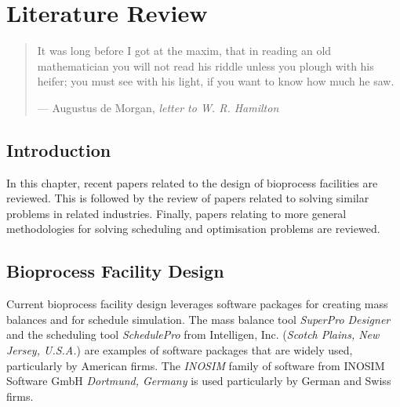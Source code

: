 %
%
%
%

\chapter{Literature Review}\label{C.litreview}

\begin{quote}
It was long before I got at the maxim, that in reading an old mathematician you
will not read his riddle unless you plough with his heifer; you must see with
his light, if you want to know how much he saw.

\hspace{2cm}--- Augustus de Morgan, \emph{letter to W. R. Hamilton}
\end{quote}

\section{Introduction}\label{S.intro2}

In this chapter, recent papers related to the design of bioprocess facilities
are reviewed.  This is followed by the review of papers related to solving
similar problems in related industries.  Finally, papers relating to more
general methodologies for solving scheduling and optimisation problems are
reviewed.

\section{Bioprocess Facility Design}\label{SS.bioprocdes}

Current bioprocess facility design leverages software packages for creating mass
balances and for schedule simulation.  The mass balance tool
\emph{SuperPro Designer\textsuperscript{\textregistered}} 
and the scheduling tool \emph{SchedulePro\textsuperscript{\textregistered}}
from Intelligen, Inc. (\emph{Scotch Plains, New Jersey, U.S.A.}) are examples of
software packages that are widely used, particularly by American firms.
The \emph{INOSIM} family of software from INOSIM Software GmbH
\emph{Dortmund, Germany} is used particularly by German and Swiss firms.


